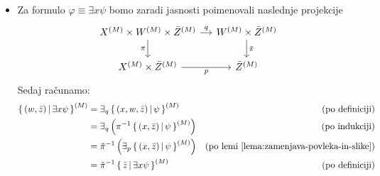 \documentclass[../kategoricna_logika.tex]{subfiles}
\begin{document}
\begin{dokaz}
\begin{itemize}
    \item Za formulo $\varphi \equiv \exists x \psi$ bomo zaradi
      jasnosti poimenovali naslednje projekcije
      \begin{equation*}
        \begin{tikzcd}[column sep=small]
          \interp{X} \times \interp{W} \times \interp{\bar{Z}} \ar[d,
          "\pi"'] \ar[r, "q"] &
          \interp{W} \times \interp{\bar{Z}} \ar[d, "\tilde{\pi}"] \\
          \interp{X} \times \interp{\bar{Z}} \ar[r, "p"'] &
          \interp{\bar{Z}}
        \end{tikzcd}
      \end{equation*}
      Sedaj računamo:
      \begin{align*}
        \left\lbrace\, (w, \bar{z}) \,\middle|\, \exists x \psi \,\right\rbrace^{(M)} &= \exists_q \left\lbrace\, (x,w,\bar{z}) \,\middle|\, \psi \,\right\rbrace^{(M)} &\text{(po definiciji)} \\
                                                  &= \exists_q \left( \pi^{-1} \left\lbrace\, (x, \bar{z}) \,\middle|\, \psi \,\right\rbrace^{(M)}\right) &\text{(po indukciji)} \\
                                                  &= \tilde{\pi}^{-1} \left( \exists_p \left\lbrace\, (x,\bar{z}) \,\middle|\, \psi \,\right\rbrace^{(M)} \right) &\text{(po lemi \ref{lema:zamenjava-povleka-in-slike})} \\
                                                  &= \tilde{\pi}^{-1} \left\lbrace\, \bar{z} \,\middle|\, \exists x \psi \,\right\rbrace^{(M)} &\text{(po definiciji)}
      \end{align*}
    \end{itemize}
  \end{dokaz}
\end{document}

